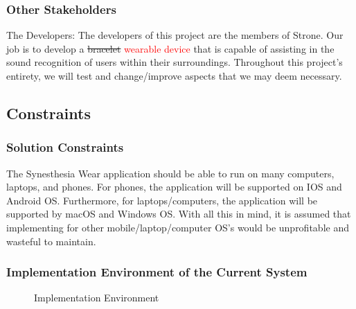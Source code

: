 \documentclass[12pt]{article}
\begin{document}
\subsubsection{Other Stakeholders}
The Developers:
The developers of this project are the members of Strone. Our job is to develop a 
\sout{bracelet} \textcolor{red}{wearable device} that is capable of assisting in the sound recognition of users within their 
surroundings. Throughout this project's entirety, we will test and change/improve 
aspects that we may deem necessary.

\subsection{Constraints}

\subsubsection{Solution Constraints}
The Synesthesia Wear application should be able to run on many computers, laptops, and
phones. For phones, the application will be supported on IOS and Android OS. 
Furthermore, for laptops/computers, the application will be supported by macOS and Windows 
OS. With all this in mind, it is assumed that implementing for other mobile/laptop/computer 
OS's would be unprofitable and wasteful to maintain.   

\subsubsection{Implementation Environment of the Current System}
\begin{figure}[h]
  \centering
  \caption{Implementation Environment}
\end{figure}
\end{document}
